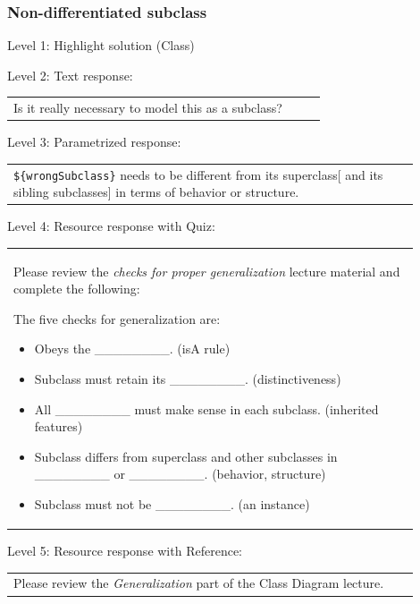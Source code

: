 \subsubsection{Non-differentiated subclass}

\noindent Level 1: Highlight solution (Class) \medskip

\noindent Level 2: Text response: \medskip

\begin{tabular}{|p{0.9\linewidth}}
Is it really necessary to model this as a subclass?
\end{tabular} \medskip

\noindent Level 3: Parametrized response: \medskip

\begin{tabular}{|p{0.9\linewidth}}
\verb|${wrongSubclass}| needs to be different from its superclass[ and its sibling subclasses] in terms of behavior or structure.
\end{tabular} \medskip

\noindent Level 4: Resource response with Quiz: \medskip

\begin{tabular}{|p{0.9\linewidth}}
Please review the \textit{checks for proper generalization} lecture material
and complete the following:

The five checks for generalization are:
\begin{itemize}
    \item Obeys the \_\_\_\_\_\_\_\_. (isA rule)
    \item Subclass must retain its \_\_\_\_\_\_\_\_. (distinctiveness)
    \item All \_\_\_\_\_\_\_\_ must make sense in each subclass. (inherited features)
    \item Subclass differs from superclass and other subclasses in \_\_\_\_\_\_\_\_ or \_\_\_\_\_\_\_\_. (behavior, structure)
    \item Subclass must not be \_\_\_\_\_\_\_\_. (an instance)
\end{itemize}

\end{tabular} \medskip

\noindent Level 5: Resource response with Reference: \medskip

\begin{tabular}{|p{0.9\linewidth}}
Please review the \textit{Generalization} part of the Class Diagram lecture.
\end{tabular} \medskip


